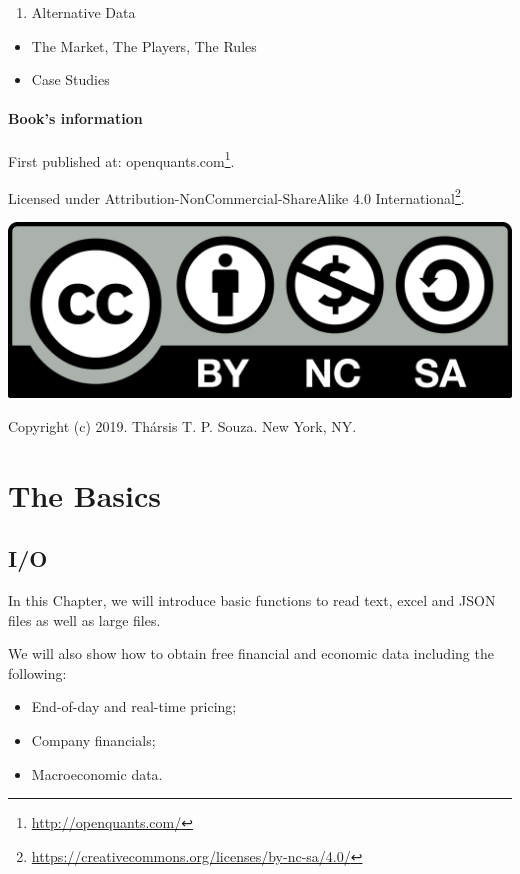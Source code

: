 \documentclass[]{book}
\DeclareRobustCommand{\href}[2]{#2\footnote{\url{#1}}}
\providecommand{\tightlist}{%
  \setlength{\itemsep}{0pt}\setlength{\parskip}{0pt}}
\theoremstyle{definition}
\theoremstyle{definition}
\theoremstyle{definition}
\theoremstyle{remark}
\let\BeginKnitrBlock\begin \let\EndKnitrBlock\end
\begin{document}
\begin{enumerate}
\def\labelenumi{\arabic{enumi}.}
\setcounter{enumi}{5}
\tightlist
\item
  Alternative Data
\end{enumerate}

\begin{itemize}
\tightlist
\item
  The Market, The Players, The Rules
\item
  Case Studies
\end{itemize}

\subsection*{Book's information}\label{books-information}


First published at: \href{http://openquants.com/}{openquants.com}.

Licensed under
\href{https://creativecommons.org/licenses/by-nc-sa/4.0/}{Attribution-NonCommercial-ShareAlike
4.0 International}.

\includegraphics[width=0.15\linewidth]{fig/by-nc-sa}

\BeginKnitrBlock{flushright}
Copyright (c) 2019. Thársis T. P. Souza. New York, NY.
\EndKnitrBlock{flushright}

\part{The Basics}\label{part-the-basics}

\chapter{I/O}\label{io}

In this Chapter, we will introduce basic functions to read text, excel
and JSON files as well as large files.

We will also show how to obtain free financial and economic data
including the following:

\begin{itemize}
\tightlist
\item
  End-of-day and real-time pricing;
\item
  Company financials;
\item
  Macroeconomic data.
\end{itemize}
\end{document}
